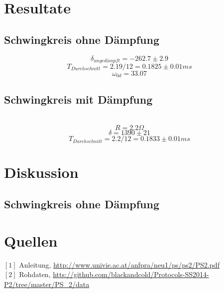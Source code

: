 \documentclass[12pt,a4paper]{article}
\begin{document}
\begin{multicols}{2}
\pagebreak
\section{Resultate}
\subsection{Schwingkreis ohne Dämpfung}
$$\delta_{ungedämpft} = -262.7 \pm 2.9$$
$$T_{Durchschnitt} = 2.19 / 12 = 0.1825\pm 0.01ms$$ 
$$\omega_{0d} = 33.07$$

\subsection{Schwingkreis mit Dämpfung}\\
$$R = 2.2\Omega$$
$$\delta = 1390 \pm 21$$
$$T_{Durchschnitt} = 2.2 / 12 = 0.1833  \pm 0.01 ms$$

\pagebreak
\section{Diskussion}
\subsection{Schwingkreis ohne Dämpfung}



\section{Quellen}
$[1]$ Anleitung, \url{http://www.univie.ac.at/anfpra/neu1/ps/ps2/PS2.pdf}\\
$[2]$ Rohdaten, \url{htts://github.com/blackandcold/Protocols-SS2014-P2/tree/master/PS_2/data}\\

\end{multicols}
\end{document}
